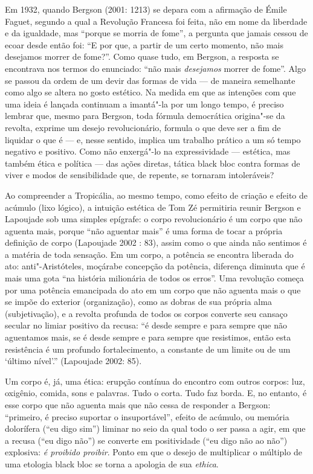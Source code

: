 Em 1932, quando Bergson (2001: 1213) se depara com a afirmação de Émile
Faguet, segundo a qual a Revolução Francesa foi feita, não em nome da
liberdade e da igualdade, mas ``porque se morria de fome'', a pergunta que
jamais cessou de ecoar desde então foi: ``E por que, a partir de um
certo momento, não mais desejamos morrer de fome?''. Como quase tudo, em
Bergson, a resposta se encontrava nos termos do enunciado: ``não mais
\emph{desejamos }morrer de fome''. Algo se passou da ordem de um devir
das formas de vida --- de maneira semelhante como algo se altera no gosto
estético. Na medida em que as intenções com que uma ideia é lançada
continuam a imantá"-la por um longo tempo, é preciso lembrar que, mesmo
para Bergson, toda fórmula democrática origina"-se da revolta, exprime um
desejo revolucionário, formula o que deve ser a fim de liquidar o que é
--- e, nesse sentido, implica um trabalho prático a um só tempo negativo
e positivo. Como não enxergá"-lo na expressividade --- estética, mas
também ética e política --- das ações diretas, tática black bloc contra
formas de viver e modos de sensibilidade que, de repente, se tornaram
intoleráveis?

Ao compreender a Tropicália, ao mesmo tempo, como efeito de criação e
efeito de acúmulo (lixo lógico), a intuição estética de Tom Zé
permitiria reunir Bergson e Lapoujade sob uma simples epígrafe: o corpo
revolucionário é um corpo que não aguenta mais, porque ``não aguentar
mais'' é uma forma de tocar a própria definição de corpo (Lapoujade 2002
: 83), assim como o que ainda não sentimos é a matéria de toda sensação.
Em um corpo, a potência se encontra liberada do ato: anti"-Aristóteles,
moçárabe concepção da potência, diferença diminuta que é mais uma gota
``na história milionária de todos os erros''. Uma revolução começa por
uma potência emancipada do ato em um corpo que não aguenta mais o que se
impõe do exterior (organização), como as dobras de sua própria alma
(subjetivação), e a revolta profunda de todos os corpos converte seu
cansaço secular no limiar positivo da recusa: ``é desde sempre e para
sempre que não aguentamos mais, se é desde sempre e para sempre que
resistimos, então esta resistência é um profundo fortalecimento, a
constante de um limite ou de um `último nível'.'' (Lapoujade 2002: 85).

Um corpo é, já, uma ética: erupção contínua do encontro com outros
corpos: luz, oxigênio, comida, sons e palavras. Tudo o corta. Tudo faz
borda. E, no entanto, é esse corpo que não aguenta mais que não cessa de
responder a Bergson: ``primeiro, é preciso suportar o insuportável'',
efeito de acúmulo, ou memória dolorífera (``eu digo sim'') liminar no
seio da qual todo o ser passa a agir, em que a recusa (``eu digo não'')
se converte em positividade (``eu digo não ao não'') explosiva: \emph{é
proibido proibir}. Ponto em que o desejo de multiplicar o múltiplo de
uma etologia black bloc se torna a apologia de sua \emph{ethica}.

